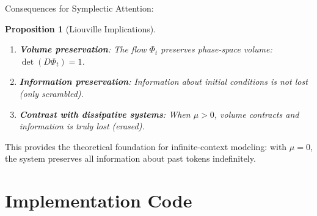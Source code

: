 \documentclass[12pt,letterpaper,twoside]{article}
\newtheorem{prop}{Proposition}[section]
\begin{document}
Consequences for Symplectic Attention:

\begin{prop}[Liouville Implications]
\begin{enumerate}
\item \textbf{Volume preservation}: The flow $\Phi_t$ preserves phase-space volume: $\det(D\Phi_t) = 1$.
\item \textbf{Information preservation}: Information about initial conditions is not lost (only scrambled).
\item \textbf{Contrast with dissipative systems}: When $\mu > 0$, volume contracts and information is truly lost (erased).
\end{enumerate}
\end{prop}

This provides the theoretical foundation for infinite-context modeling: with $\mu = 0$, the system preserves all information about past tokens indefinitely.

\section{Implementation Code}
\end{document}
